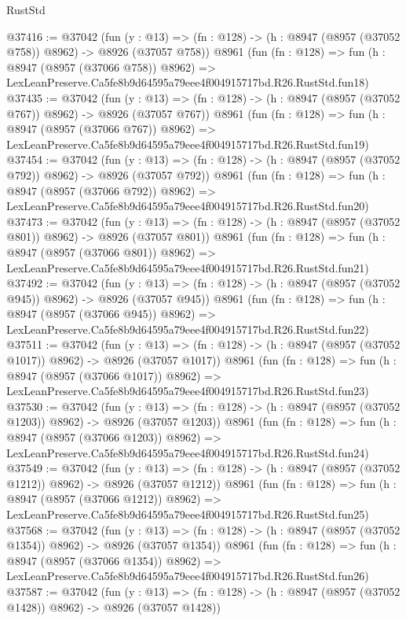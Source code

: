 \begin{lexlean}{RustStd}
\begin{coremodule}
@37416 := @37042
    (fun (y : @13) => (fn : @128) -> (h : @8947 (@8957 (@37052 @758)) @8962) -> @8926 (@37057 @758))
    @8961
    (fun (fn : @128) =>
    fun (h : @8947 (@8957 (@37066 @758)) @8962) =>
    LexLeanPreserve.Ca5fe8b9d64595a79eee4f004915717bd.R26.RustStd.fun18)
@37435 := @37042
    (fun (y : @13) => (fn : @128) -> (h : @8947 (@8957 (@37052 @767)) @8962) -> @8926 (@37057 @767))
    @8961
    (fun (fn : @128) =>
    fun (h : @8947 (@8957 (@37066 @767)) @8962) =>
    LexLeanPreserve.Ca5fe8b9d64595a79eee4f004915717bd.R26.RustStd.fun19)
@37454 := @37042
    (fun (y : @13) => (fn : @128) -> (h : @8947 (@8957 (@37052 @792)) @8962) -> @8926 (@37057 @792))
    @8961
    (fun (fn : @128) =>
    fun (h : @8947 (@8957 (@37066 @792)) @8962) =>
    LexLeanPreserve.Ca5fe8b9d64595a79eee4f004915717bd.R26.RustStd.fun20)
@37473 := @37042
    (fun (y : @13) => (fn : @128) -> (h : @8947 (@8957 (@37052 @801)) @8962) -> @8926 (@37057 @801))
    @8961
    (fun (fn : @128) =>
    fun (h : @8947 (@8957 (@37066 @801)) @8962) =>
    LexLeanPreserve.Ca5fe8b9d64595a79eee4f004915717bd.R26.RustStd.fun21)
@37492 := @37042
    (fun (y : @13) => (fn : @128) -> (h : @8947 (@8957 (@37052 @945)) @8962) -> @8926 (@37057 @945))
    @8961
    (fun (fn : @128) =>
    fun (h : @8947 (@8957 (@37066 @945)) @8962) =>
    LexLeanPreserve.Ca5fe8b9d64595a79eee4f004915717bd.R26.RustStd.fun22)
@37511 := @37042
    (fun (y : @13) =>
    (fn : @128) -> (h : @8947 (@8957 (@37052 @1017)) @8962) -> @8926 (@37057 @1017))
    @8961
    (fun (fn : @128) =>
    fun (h : @8947 (@8957 (@37066 @1017)) @8962) =>
    LexLeanPreserve.Ca5fe8b9d64595a79eee4f004915717bd.R26.RustStd.fun23)
@37530 := @37042
    (fun (y : @13) =>
    (fn : @128) -> (h : @8947 (@8957 (@37052 @1203)) @8962) -> @8926 (@37057 @1203))
    @8961
    (fun (fn : @128) =>
    fun (h : @8947 (@8957 (@37066 @1203)) @8962) =>
    LexLeanPreserve.Ca5fe8b9d64595a79eee4f004915717bd.R26.RustStd.fun24)
@37549 := @37042
    (fun (y : @13) =>
    (fn : @128) -> (h : @8947 (@8957 (@37052 @1212)) @8962) -> @8926 (@37057 @1212))
    @8961
    (fun (fn : @128) =>
    fun (h : @8947 (@8957 (@37066 @1212)) @8962) =>
    LexLeanPreserve.Ca5fe8b9d64595a79eee4f004915717bd.R26.RustStd.fun25)
@37568 := @37042
    (fun (y : @13) =>
    (fn : @128) -> (h : @8947 (@8957 (@37052 @1354)) @8962) -> @8926 (@37057 @1354))
    @8961
    (fun (fn : @128) =>
    fun (h : @8947 (@8957 (@37066 @1354)) @8962) =>
    LexLeanPreserve.Ca5fe8b9d64595a79eee4f004915717bd.R26.RustStd.fun26)
@37587 := @37042
    (fun (y : @13) =>
    (fn : @128) -> (h : @8947 (@8957 (@37052 @1428)) @8962) -> @8926 (@37057 @1428))

\end{coremodule}
\end{lexlean}
